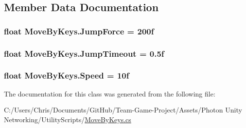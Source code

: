 \subsection{Member Data Documentation}
\subsubsection[{\texorpdfstring{Jump\+Force}{JumpForce}}]{\setlength{\rightskip}{0pt plus 5cm}float Move\+By\+Keys.\+Jump\+Force = 200f}\hypertarget{class_move_by_keys_a88d3e6e148a44325eb48ec6cc3fd0f03}{}\label{class_move_by_keys_a88d3e6e148a44325eb48ec6cc3fd0f03}
\subsubsection[{\texorpdfstring{Jump\+Timeout}{JumpTimeout}}]{\setlength{\rightskip}{0pt plus 5cm}float Move\+By\+Keys.\+Jump\+Timeout = 0.\+5f}\hypertarget{class_move_by_keys_a78f351dfc4cfdf17213df54dee9ba73f}{}\label{class_move_by_keys_a78f351dfc4cfdf17213df54dee9ba73f}
\subsubsection[{\texorpdfstring{Speed}{Speed}}]{\setlength{\rightskip}{0pt plus 5cm}float Move\+By\+Keys.\+Speed = 10f}\hypertarget{class_move_by_keys_aaa10538c39f807176b9edecb494f6ace}{}\label{class_move_by_keys_aaa10538c39f807176b9edecb494f6ace}


The documentation for this class was generated from the following file\+:\begin{DoxyCompactItemize}
\item 
C\+:/\+Users/\+Chris/\+Documents/\+Git\+Hub/\+Team-\/\+Game-\/\+Project/\+Assets/\+Photon Unity Networking/\+Utility\+Scripts/\hyperlink{_move_by_keys_8cs}{Move\+By\+Keys.\+cs}\end{DoxyCompactItemize}
